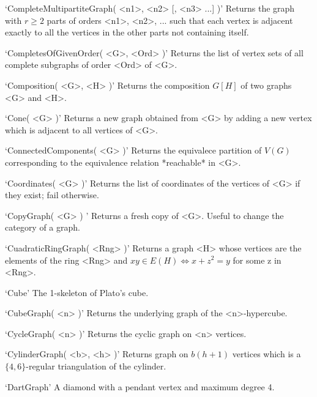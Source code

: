 `CompleteMultipartiteGraph( <n1>, <n2> [, <n3> ...] )'\newline\hglue 5mm 
Returns the graph with $r\geq 2$ parts of orders <n1>, <n2>, ... such that each vertex is adjacent exactly to all the vertices in the other parts not containing itself.

`CompletesOfGivenOrder( <G>, <Ord> )'\newline\hglue 5mm 
Returns the list of vertex sets of all complete subgraphs of order <Ord> of <G>.

`Composition( <G>, <H> )'\newline\hglue 5mm 
Returns the composition $G[H]$ of two graphs <G> and <H>.

`Cone( <G> )'\newline\hglue 5mm 
Returns a new graph obtained from <G> by adding a new vertex which is adjacent to all vertices of <G>.

`ConnectedComponents( <G> )'\newline\hglue 5mm 
Returns the equivalece partition of $V(G)$ corresponding to the equivalence relation *reachable* in <G>.

`Coordinates( <G> )'\newline\hglue 5mm 
Returns the list of coordinates of the vertices of <G> if they exist; fail otherwise.

`CopyGraph( <G> ) '\newline\hglue 5mm 
Returns a fresh copy of <G>. Useful to change the category of a graph.

`CuadraticRingGraph( <Rng> )'\newline\hglue 5mm 
Returns a graph <H> whose vertices are the elements of the ring <Rng> and $xy\in E(H) \iff x+z^2=y$ for some z in <Rng>.

`Cube'\newline\hglue 5mm 
The 1-skeleton of Plato's cube.

`CubeGraph( <n> )'\newline\hglue 5mm 
Returns the underlying graph of the <n>-hypercube.

`CycleGraph( <n> )'\newline\hglue 5mm 
Returns the cyclic graph on <n> vertices. 

`CylinderGraph( <b>, <h> )'\newline\hglue 5mm 
Returns graph on $b(h+1)$ vertices which is a $\{4,6\}$-regular triangulation of the cylinder.

`DartGraph'\newline\hglue 5mm 
A diamond with a pendant vertex and maximum degree 4.

